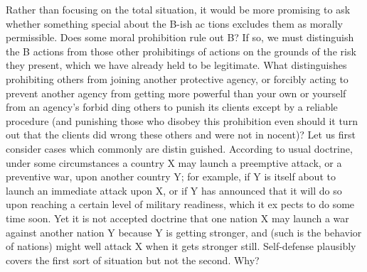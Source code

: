 \documentclass[11pt,openany]{book}
\begin{document}
Rather than focusing on the total situation, it would be more promising to ask whether something special about the B-ish ac tions excludes them as morally permissible. Does some moral prohibition rule out B? If so, we must distinguish the B actions from those other prohibitings of actions on the grounds of the risk they present, which we have already held to be legitimate. What distinguishes prohibiting others from joining another protective agency, or forcibly acting to prevent another agency from getting more powerful than your own or yourself from an agency's forbid ding others to punish its clients except by a reliable procedure (and punishing those who disobey this prohibition even should it turn out that the clients did wrong these others and were not in nocent)? Let us first consider cases which commonly are distin guished. According to usual doctrine, under some circumstances a country X may launch a preemptive attack, or a preventive war, upon another country Y; for example, if Y is itself about to launch an immediate attack upon X, or if Y has announced that it will do so upon reaching a certain level of military readiness, which it ex pects to do some time soon. Yet it is not accepted doctrine that one nation X may launch a war against another nation Y because Y is getting stronger, and (such is the behavior of nations) might well attack X when it gets stronger still. Self-defense plausibly covers the first sort of situation but not the second. Why? 
\end{document}

